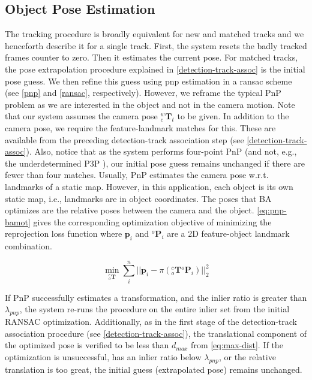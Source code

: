 \documentclass[headsepline, hidelinks, footsepline, footinclude=false, oneside, fontsize=11pt, paper=a4, listof=totoc, bibliography=totoc]{scrbook}
\begin{document}
\subsection{Object Pose Estimation}
\label{sec:org8e7e12a}
    The tracking procedure is broadly equivalent for new and matched tracks and we henceforth describe it for a single track.
First, the system resets the badly tracked frames counter to zero. Then it estimates the current pose. 
For matched tracks, the pose extrapolation procedure explained in \cref{detection-track-assoc} is the initial pose guess. 
We then refine this guess using \gls{pnp} estimation in a \gls{ransac} scheme (see \cref{pnp} and \cref{ransac}, respectively). 
However, we reframe the typical PnP problem as we are interested in the object and not in the camera motion.
Note that our system assumes the camera pose \({}^{w}_{c}\mathbf{T}_t\) to be given. 
In addition to the camera pose, we require the feature-landmark matches for this. These are available from the preceding detection-track association step (see \cref{detection-track-assoc}).
Also, notice that as the system performs four-point PnP (and not, e.g., the underdetermined P3P \cite{xiao-shangaoCompleteSolutionClassification2003}), our initial pose guess remains unchanged if there are fewer than four matches.
Usually, PnP estimates the camera pose w.r.t. landmarks of a static map. However, in this application, each object is its own static map, i.e., landmarks are in object coordinates. 
The poses that BA optimizes are the relative poses between the camera and the object. 
\cref{eq:pnp-bamot} gives the corresponding optimization objective of minimizing the reprojection loss function where \(\mathbf{p}_i\) and \({}^o\mathbf{P}_i\) are a 2D feature-object landmark combination.

\begin{equation}
\label{eq:pnp-bamot}
\min_{{}^c_o\mathbf{T}} \sum_i^n||\mathbf{p}_i - \pi({}^c_o\mathbf{T}{}^o\mathbf{P}_i)||_2^2
\end{equation}

If PnP successfully estimates a transformation, and the inlier ratio is greater than \(\lambda_{pnp}\), the system re-runs the procedure on the entire inlier set from the initial RANSAC optimization. 
Additionally, as in the first stage of the detection-track association procedure (see \cref{detection-track-assoc}), the translational component of the optimized pose is verified to be
less than \(d_{max}\) from \cref{eq:max-dist}. If the optimization is unsuccessful, has an inlier ratio below \(\lambda_{pnp}\), or the relative translation is too great, the initial guess (extrapolated pose) remains unchanged.
\end{document}
